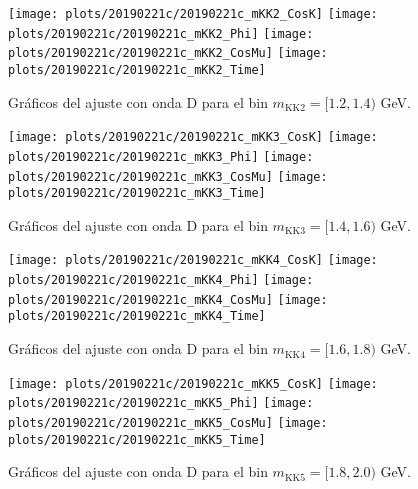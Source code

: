 \begin{figure}[H]
\centering
\begin{multicols}{2}
\texttt{[image: plots/20190221c/20190221c\_mKK2\_CosK]}
\texttt{[image: plots/20190221c/20190221c\_mKK2\_Phi]}
\texttt{[image: plots/20190221c/20190221c\_mKK2\_CosMu]}
\texttt{[image: plots/20190221c/20190221c\_mKK2\_Time]}
\end{multicols}
\vspace*{-0.5cm}
\caption{Gráficos del ajuste con onda D para el bin $m_{\text{KK}2} = [1.2,1.4)$ GeV.}  
\end{figure}

\begin{figure}[H]
\centering
\begin{multicols}{2}
\texttt{[image: plots/20190221c/20190221c\_mKK3\_CosK]}
\texttt{[image: plots/20190221c/20190221c\_mKK3\_Phi]}
\texttt{[image: plots/20190221c/20190221c\_mKK3\_CosMu]}
\texttt{[image: plots/20190221c/20190221c\_mKK3\_Time]}
\end{multicols}
\vspace*{-0.5cm}
\caption{Gráficos del ajuste con onda D para el bin $m_{\text{KK}3} = [1.4,1.6)$ GeV.}  
\end{figure}

\begin{figure}[H]
\centering
\begin{multicols}{2}
\texttt{[image: plots/20190221c/20190221c\_mKK4\_CosK]}
\texttt{[image: plots/20190221c/20190221c\_mKK4\_Phi]}
\texttt{[image: plots/20190221c/20190221c\_mKK4\_CosMu]}
\texttt{[image: plots/20190221c/20190221c\_mKK4\_Time]}
\end{multicols}
\vspace*{-0.5cm}
\caption{Gráficos del ajuste con onda D para el bin $m_{\text{KK}4} = [1.6,1.8)$ GeV.}  
\end{figure}

\begin{figure}[H]
\centering
\begin{multicols}{2}
\texttt{[image: plots/20190221c/20190221c\_mKK5\_CosK]}
\texttt{[image: plots/20190221c/20190221c\_mKK5\_Phi]}
\texttt{[image: plots/20190221c/20190221c\_mKK5\_CosMu]}
\texttt{[image: plots/20190221c/20190221c\_mKK5\_Time]}
\end{multicols}
\vspace*{-0.5cm}
\caption{Gráficos del ajuste con onda D para el bin $m_{\text{KK}5} = [1.8,2.0)$ GeV.}  
\end{figure}


